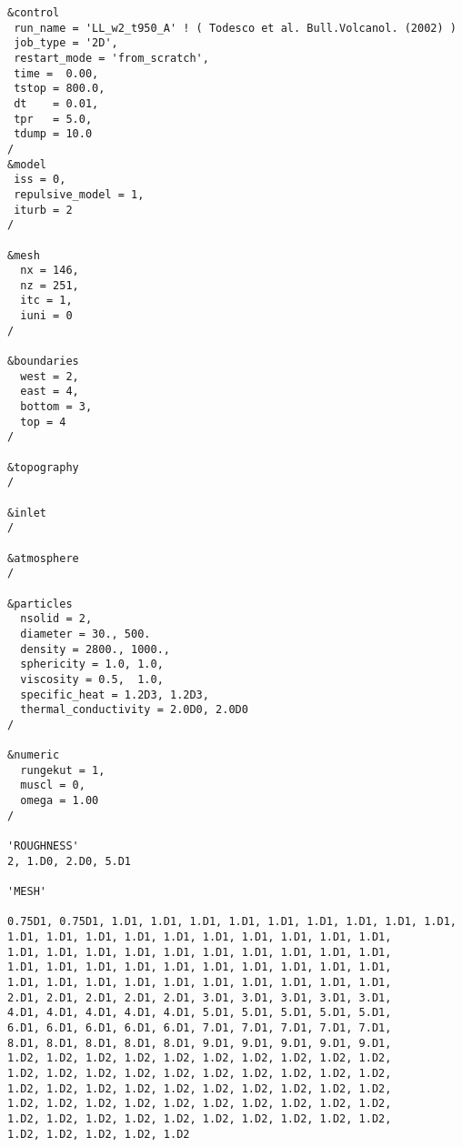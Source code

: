 \begin{verbatim}
&control
 run_name = 'LL_w2_t950_A' ! ( Todesco et al. Bull.Volcanol. (2002) )
 job_type = '2D',
 restart_mode = 'from_scratch',
 time =  0.00,
 tstop = 800.0,
 dt    = 0.01,
 tpr   = 5.0,
 tdump = 10.0
/
&model
 iss = 0,
 repulsive_model = 1,
 iturb = 2
/

&mesh
  nx = 146,
  nz = 251,
  itc = 1,
  iuni = 0
/

&boundaries
  west = 2,
  east = 4,
  bottom = 3,
  top = 4
/

&topography
/

&inlet
/

&atmosphere
/

&particles
  nsolid = 2, 
  diameter = 30., 500.
  density = 2800., 1000.,
  sphericity = 1.0, 1.0,
  viscosity = 0.5,  1.0,
  specific_heat = 1.2D3, 1.2D3, 
  thermal_conductivity = 2.0D0, 2.0D0
/

&numeric
  rungekut = 1,
  muscl = 0,
  omega = 1.00
/

'ROUGHNESS'
2, 1.D0, 2.D0, 5.D1

'MESH'

0.75D1, 0.75D1, 1.D1, 1.D1, 1.D1, 1.D1, 1.D1, 1.D1, 1.D1, 1.D1, 1.D1,
1.D1, 1.D1, 1.D1, 1.D1, 1.D1, 1.D1, 1.D1, 1.D1, 1.D1, 1.D1,
1.D1, 1.D1, 1.D1, 1.D1, 1.D1, 1.D1, 1.D1, 1.D1, 1.D1, 1.D1,
1.D1, 1.D1, 1.D1, 1.D1, 1.D1, 1.D1, 1.D1, 1.D1, 1.D1, 1.D1,
1.D1, 1.D1, 1.D1, 1.D1, 1.D1, 1.D1, 1.D1, 1.D1, 1.D1, 1.D1,
2.D1, 2.D1, 2.D1, 2.D1, 2.D1, 3.D1, 3.D1, 3.D1, 3.D1, 3.D1,
4.D1, 4.D1, 4.D1, 4.D1, 4.D1, 5.D1, 5.D1, 5.D1, 5.D1, 5.D1,
6.D1, 6.D1, 6.D1, 6.D1, 6.D1, 7.D1, 7.D1, 7.D1, 7.D1, 7.D1,
8.D1, 8.D1, 8.D1, 8.D1, 8.D1, 9.D1, 9.D1, 9.D1, 9.D1, 9.D1,
1.D2, 1.D2, 1.D2, 1.D2, 1.D2, 1.D2, 1.D2, 1.D2, 1.D2, 1.D2,
1.D2, 1.D2, 1.D2, 1.D2, 1.D2, 1.D2, 1.D2, 1.D2, 1.D2, 1.D2,
1.D2, 1.D2, 1.D2, 1.D2, 1.D2, 1.D2, 1.D2, 1.D2, 1.D2, 1.D2,
1.D2, 1.D2, 1.D2, 1.D2, 1.D2, 1.D2, 1.D2, 1.D2, 1.D2, 1.D2,
1.D2, 1.D2, 1.D2, 1.D2, 1.D2, 1.D2, 1.D2, 1.D2, 1.D2, 1.D2,
1.D2, 1.D2, 1.D2, 1.D2, 1.D2


\end{verbatim}
